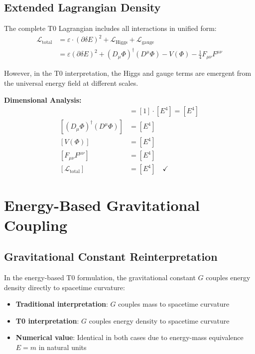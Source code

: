 \documentclass[12pt,a4paper]{report}
\begin{document}
\subsection{Extended Lagrangian Density}
\label{subsec:extended_lagrangian}

The complete T0 Lagrangian includes all interactions in unified form:
\begin{align}
	\mathcal{L}_{\text{total}} &= \varepsilon \cdot (\partial \delta E)^2 + \mathcal{L}_{\text{Higgs}} + \mathcal{L}_{\text{gauge}} \\
	&= \varepsilon (\partial \delta E)^2 + (D_\mu \Phi)^\dagger (D^\mu \Phi) - V(\Phi) - \frac{1}{4} F_{\mu\nu} F^{\mu\nu}
\end{align}

However, in the T0 interpretation, the Higgs and gauge terms are emergent from the universal energy field at different scales.

\textbf{Dimensional Analysis:}
\begin{align}
	[\varepsilon (\partial \delta E)^2] &= [1] \cdot [E^4] = [E^4] \\
	[(D_\mu \Phi)^\dagger (D^\mu \Phi)] &= [E^4] \\
	[V(\Phi)] &= [E^4] \\
	[F_{\mu\nu} F^{\mu\nu}] &= [E^4] \\
	[\mathcal{L}_{\text{total}}] &= [E^4] \quad \checkmark
\end{align}
	\section{Energy-Based Gravitational Coupling}
	\label{sec:energy_gravitational_coupling}
	
	\subsection{Gravitational Constant Reinterpretation}
	\label{subsec:gravitational_reinterpretation}
	
	In the energy-based T0 formulation, the gravitational constant $G$ couples energy density directly to spacetime curvature:
	
	\begin{itemize}
		\item \textbf{Traditional interpretation}: $G$ couples mass to spacetime curvature
		\item \textbf{T0 interpretation}: $G$ couples energy density to spacetime curvature
		\item \textbf{Numerical value}: Identical in both cases due to energy-mass equivalence $E = m$ in natural units
	\end{itemize}
	
\end{document}
